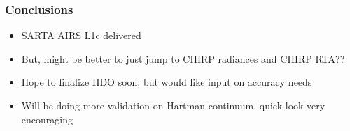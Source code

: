 \documentclass[10pt,t]{beamer}
\begin{document}
\begin{frame}
  \frametitle{Conclusions}
  \begin{itemize}
  \item SARTA AIRS L1c delivered
  \item But, might be better to just jump to CHIRP radiances and CHIRP RTA??
  \item Hope to finalize HDO soon, but would like input on accuracy needs
  \item Will be doing more validation on Hartman continuum, quick look very encouraging
  \end{itemize}
\end{frame}





  


    

\end{document}
